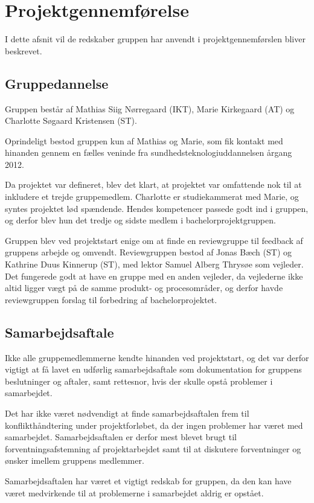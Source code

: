 \chapter{Projektgennemførelse}\label{kapitel_Projektgennemforelse}
I dette afsnit vil de redskaber gruppen har anvendt i projektgennemførslen bliver beskrevet. 

\section{Gruppedannelse}
Gruppen består af Mathias Siig Nørregaard (IKT), Marie Kirkegaard (AT) og Charlotte Søgaard Kristensen (ST). 

Oprindeligt bestod gruppen kun af Mathias og Marie, som fik kontakt med hinanden gennem en fælles veninde fra sundhedsteknologiuddannelsen årgang 2012.

Da projektet var defineret, blev det klart, at  projektet var omfattende nok til at inkludere et trejde gruppemedlem. Charlotte er studiekammerat med Marie, og syntes projektet lød spændende. Hendes kompetencer passede godt ind i gruppen, og derfor blev hun det tredje og sidste medlem i bachelorprojektgruppen. 

Gruppen blev ved projektstart enige om at finde en reviewgruppe til feedback af gruppens arbejde og omvendt. Reviewgruppen bestod af Jonas Bæch (ST) og Kathrine Duus Kinnerup (ST), med lektor Samuel Alberg Thrysøe som vejleder. Det fungerede godt at have en gruppe med en anden vejleder, da vejlederne ikke altid ligger vægt på de samme produkt- og procesområder, og derfor havde reviewgruppen forslag til forbedring af bachelorprojektet.  

\section{Samarbejdsaftale}
Ikke alle gruppemedlemmerne kendte hinanden ved projektstart, og det var derfor vigtigt at få lavet en udførlig samarbejdsaftale som dokumentation for gruppens beslutninger og aftaler, samt rettesnor, hvis der skulle opstå problemer i samarbejdet. 

Det har ikke været nødvendigt at finde samarbejdsaftalen frem til konflikthåndtering under projektforløbet, da der ingen problemer har været med samarbejdet. Samarbejdsaftalen er derfor mest blevet brugt til forventningsafstemning af projektarbejdet samt til at diskutere forventninger og ønsker imellem gruppens medlemmer. 

Samarbejdsaftalen har været et vigtigt redskab for gruppen, da den kan have været medvirkende til at problemerne i samarbejdet aldrig er opstået. 

